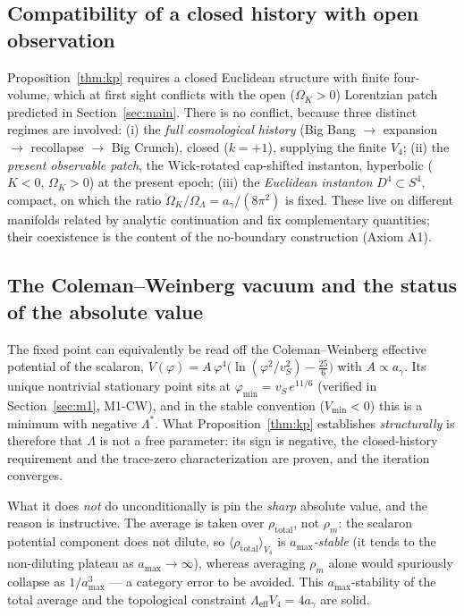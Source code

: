 \documentclass[11pt,a4paper]{article}
\theoremstyle{plain}
\theoremstyle{definition}
\theoremstyle{remark}
\newcommand{\Ok}{\Omega_K}
\newcommand{\OL}{\Omega_\Lambda}
\newcommand{\ag}{a_\gamma}
\newcommand{\avg}[1]{\langle #1 \rangle}
\begin{document}
\subsection{Compatibility of a closed history with open observation}
Proposition~\ref{thm:kp} requires a closed Euclidean structure with finite four-volume, which at
first sight conflicts with the open ($\Ok > 0$) Lorentzian patch predicted in
Section~\ref{sec:main}. There is no conflict, because three distinct regimes are involved:
(i) the \emph{full cosmological history} (Big Bang $\to$ expansion $\to$ recollapse $\to$ Big
Crunch), closed ($k=+1$), supplying the finite $V_4$; (ii) the \emph{present observable patch},
the Wick-rotated cap-shifted instanton, hyperbolic ($K<0$, $\Ok>0$) at the present epoch;
(iii) the \emph{Euclidean instanton} $D^4\subset S^4$, compact, on which the ratio
$\Ok/\OL = \ag/(8\pi^2)$ is fixed. These live on different manifolds related by analytic
continuation and fix complementary quantities; their coexistence is the content of the
no-boundary construction (Axiom A1).

\subsection{The Coleman--Weinberg vacuum and the status of the absolute value}
The fixed point can equivalently be read off the Coleman--Weinberg effective potential of the
scalaron, $V(\varphi) = A\,\varphi^4\big(\ln(\varphi^2/v_S^2) - \tfrac{25}{6}\big)$ with
$A \propto \ag$. Its unique nontrivial stationary point sits at $\varphi_{\min} = v_S\,e^{11/6}$
(verified in Section~\ref{sec:m1}, M1-CW), and in the stable convention ($V_{\min}<0$) this is
a minimum with negative $\Lambda^*$. What Proposition~\ref{thm:kp} establishes \emph{structurally}
is therefore that $\Lambda$ is not a free parameter: its sign is negative, the closed-history
requirement and the trace-zero characterization are proven, and the iteration converges.

What it does \emph{not} do unconditionally is pin the \emph{sharp} absolute value, and the
reason is instructive. The average is taken over $\rho_{\mathrm{total}}$, not $\rho_m$: the
scalaron potential component does not dilute, so $\avg{\rho_{\mathrm{total}}}_{V_4}$ is
\emph{$a_{\max}$-stable} (it tends to the non-diluting plateau as $a_{\max}\to\infty$), whereas
averaging $\rho_m$ alone would spuriously collapse as $1/a_{\max}^3$ --- a category error to be
avoided. This $a_{\max}$-stability of the total average and the topological constraint
$\Lambda_{\mathrm{eff}}V_4 = 4\ag$ are solid.
\end{document}

